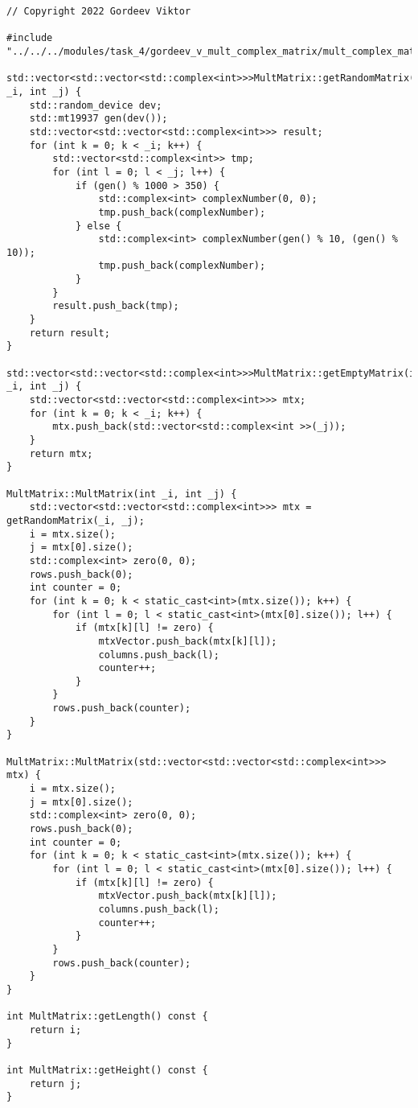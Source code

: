 \documentclass{report}
\begin{document}
\begin{lstlisting}
// Copyright 2022 Gordeev Viktor

#include "../../../modules/task_4/gordeev_v_mult_complex_matrix/mult_complex_matrix.h"

std::vector<std::vector<std::complex<int>>>MultMatrix::getRandomMatrix(int _i, int _j) {
    std::random_device dev;
    std::mt19937 gen(dev());
    std::vector<std::vector<std::complex<int>>> result;
    for (int k = 0; k < _i; k++) {
        std::vector<std::complex<int>> tmp;
        for (int l = 0; l < _j; l++) {
            if (gen() % 1000 > 350) {
                std::complex<int> complexNumber(0, 0);
                tmp.push_back(complexNumber);
            } else {
                std::complex<int> complexNumber(gen() % 10, (gen() % 10));
                tmp.push_back(complexNumber);
            }
        }
        result.push_back(tmp);
    }
    return result;
}

std::vector<std::vector<std::complex<int>>>MultMatrix::getEmptyMatrix(int _i, int _j) {
    std::vector<std::vector<std::complex<int>>> mtx;
    for (int k = 0; k < _i; k++) {
        mtx.push_back(std::vector<std::complex<int >>(_j));
    }
    return mtx;
}

MultMatrix::MultMatrix(int _i, int _j) {
    std::vector<std::vector<std::complex<int>>> mtx = getRandomMatrix(_i, _j);
    i = mtx.size();
    j = mtx[0].size();
    std::complex<int> zero(0, 0);
    rows.push_back(0);
    int counter = 0;
    for (int k = 0; k < static_cast<int>(mtx.size()); k++) {
        for (int l = 0; l < static_cast<int>(mtx[0].size()); l++) {
            if (mtx[k][l] != zero) {
                mtxVector.push_back(mtx[k][l]);
                columns.push_back(l);
                counter++;
            }
        }
        rows.push_back(counter);
    }
}

MultMatrix::MultMatrix(std::vector<std::vector<std::complex<int>>> mtx) {
    i = mtx.size();
    j = mtx[0].size();
    std::complex<int> zero(0, 0);
    rows.push_back(0);
    int counter = 0;
    for (int k = 0; k < static_cast<int>(mtx.size()); k++) {
        for (int l = 0; l < static_cast<int>(mtx[0].size()); l++) {
            if (mtx[k][l] != zero) {
                mtxVector.push_back(mtx[k][l]);
                columns.push_back(l);
                counter++;
            }
        }
        rows.push_back(counter);
    }
}

int MultMatrix::getLength() const {
    return i;
}

int MultMatrix::getHeight() const {
    return j;
}


\end{lstlisting}
\end{document}
